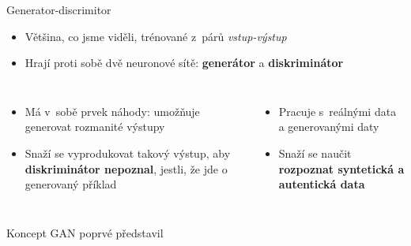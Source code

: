 \documentclass[handout,aspectratio=169,dvipsnames]{beamer}
\begin{document}
\begin{frame}{Generator-discrimitor}

    \begin{itemize}[<+->]

        \item Většina, co jsme viděli, trénované z~párů \emph{vstup-výstup}

        \item Hrají proti sobě dvě neuronové sítě: {\bf generátor} a {\bf
            diskriminátor}

    \end{itemize}

    \vspace{10pt}

    \begin{columns}[t]

        \begin{itemize}

            \item<4-> Má v~sobě prvek náhody: umožňuje generovat rozmanité výstupy

            \item<5-> Snaží se vyprodukovat takový výstup, aby
                \textbf{diskriminátor nepoznal}, jestli, že jde o generovaný
                příklad

        \end{itemize}


        \begin{itemize}

            \item<6-> Pracuje s~reálnými data a generovanými daty

            \item<7-> Snaží se naučit \textbf{rozpoznat syntetická a autentická
                data}


        \end{itemize}

    \end{columns}

    \vspace{10pt}

    \tiny Koncept GAN poprvé představil \citet{goodfellow2014generative}

\end{frame}
\end{document}

